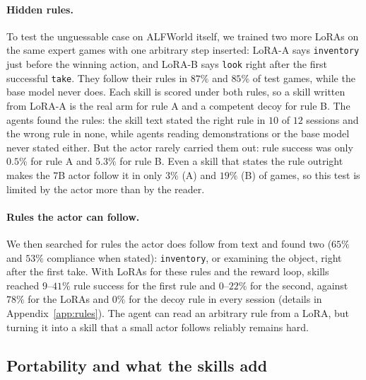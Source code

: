 \documentclass[11pt]{article}
\begin{document}
\paragraph{Hidden rules.} To test the unguessable case on ALFWorld itself, we trained two more LoRAs on the same expert games with one arbitrary step
inserted: LoRA-A says \texttt{inventory} just before the winning action, and LoRA-B says \texttt{look} right after the first successful \texttt{take}.
They follow their rules in $87\%$ and $85\%$ of test games, while the base model never does. Each skill is scored under both rules, so a skill
written from LoRA-A is the real arm for rule A and a competent decoy for rule B. The agents found the rules: the skill text stated the right rule in
$10$ of $12$ sessions and the wrong rule in none, while agents reading demonstrations or the base model never stated either. But the actor rarely
carried them out: rule success was only $0.5\%$ for rule A and $5.3\%$ for rule B. Even a skill that states the rule outright makes the 7B actor follow it in only $3\%$ (A) and
$19\%$ (B) of games, so this test is limited by the actor more than by the reader.

\paragraph{Rules the actor can follow.} We then searched for rules the actor does follow from text and found
two ($65\%$ and $53\%$ compliance when stated): \texttt{inventory}, or examining the object, right after the first take. With LoRAs for these rules and
the reward loop, skills reached $9$--$41\%$ rule success for the first rule and $0$--$22\%$ for the second, against $78\%$ for the LoRAs and $0\%$ for the decoy rule in every session (details in Appendix~\ref{app:rules}). The agent can read an arbitrary rule from a LoRA, but turning it into a skill that a small
actor follows reliably remains hard.

\subsection{Portability and what the skills add}
\label{sec:ax-port}
\end{document}
